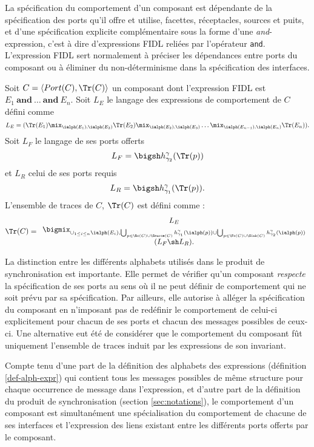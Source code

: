 La sp\'ecification du comportement d'un composant est d\'ependante de la
sp\'ecification des ports qu'il offre et utilise, facettes,
r\'eceptacles, sources et puits, et d'une
sp\'ecification explicite compl\'ementaire sous la forme d'une
\emph{and}-expression, c'est \`a dire d'expressions \textsf{FIDL} reli\'ees par
  l'op\'erateur \texttt{and}. L'expression \textsf{FIDL} sert
normalement \`a pr\'eciser les d\'ependances entre ports du composant ou \`a
\'eliminer du non-d\'eterminisme dans la sp\'ecification des
interfaces. 

\begin{definition}
\label{def:tracescomp}
    Soit $C = \langle Port(C),\Tr(C) \rangle$ un composant dont l'expression \textsf{FIDL} est $E_1\
    \mathbf{and}\ \dots\ \mathbf{and}\ E_n$. 
Soit $L_E$ le langage des expressions de comportement de $C$ d\'efini
    comme 
$$
L_E =  (\Tr(E_1) \mix_{\ialph(E_1),\ialph(E_2)} \Tr(E_2)
      \mix_{\ialph(E_2),\ialph(E_3)} \dots
      \mix_{\ialph(E_{n-1}),\ialph(E_n)} \Tr(E_n)).
$$
Soit $L_F$ le langage de
    ses ports offerts   
$$
L_F=\bigsh h_{\gamma_2}^\gamma(\Tr(p))
$$
et $L_R$ celui de ses ports requis 
$$
L_R=\bigsh h_{\gamma_1}^\gamma(\Tr(p)).
  $$
L'ensemble de traces de
    $C$, $\Tr(C)$  est d\'efini comme  :
    $$
    \Tr(C) = 
    \begin{array}{c}
L_E \\
   \bigmix_{\cup_{1\leq i\leq n} \ialph(E_i),
      \bigcup_{p\in \Rc(C)\cup
   \Source(C)}h_{\gamma_1}^\gamma(\ialph(p))\cup \bigcup_{p\in \Fc(C)\cup
   \Sink(C)}h_{\gamma_2}^\gamma(\ialph(p))}
      \\
 (L_F \sh L_R).
\end{array}
$$
\end{definition}

La distinction entre les diff\'erents alphabets utilis\'es dans le
produit de synchronisation est importante. Elle permet de v\'erifier qu'un composant \emph{respecte} la
sp\'ecification de ses ports au sens o\`u il ne peut d\'efinir de
comportement qui ne soit pr\'evu par sa sp\'ecification. Par
ailleurs, elle autorise \`a all\'eger la sp\'ecification du composant en n'imposant pas
de red\'efinir le comportement de celui-ci explicitement pour chacun
de ses ports et chacun des messages possibles de
ceux-ci. Une alternative eut \'et\'e de consid\'erer que le
comportement du composant f\^ut uniquement l'ensemble de traces
induit par les expressions de son invariant.

Compte tenu
d'une part de la d\'efinition des alphabets des expressions
(d\'efinition \ref{def-alph-expr}) qui contient tous les messages
possibles de m\^eme structure pour chaque occurrence de message dans
l'expression, et d'autre part de la d\'efinition du produit de
synchronisation (section \ref{sec:notations}), le comportement d'un
composant est simultan\'ement une sp\'ecialisation du comportement de chacune de
ses interfaces et l'expression des liens existant entre les
diff\'erents ports offerts par le composant. 


